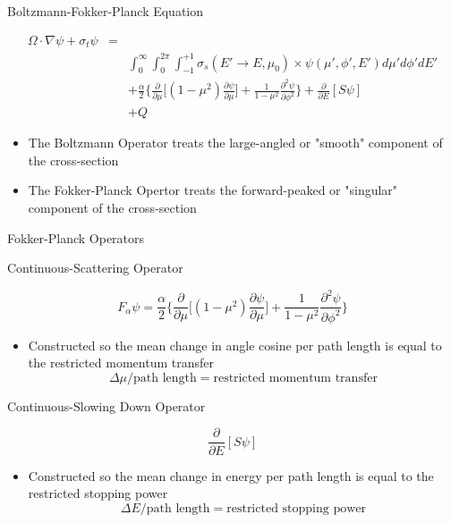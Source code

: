 \documentclass{beamer}
\begin{document}
\begin{frame}{Boltzmann-Fokker-Planck Equation}
 
    \begin{eqnarray*}
      \Omega \cdot \nabla \psi + \sigma_t\psi &= & \\
      & & \int_{0}^{\infty}\int_{0}^{2\pi}\int_{-1}^{+1} \sigma_s(E'\rightarrow E,\mu_0)
       \times\psi(\mu',\phi',E')d\mu'd\phi'dE' \\
       & &+ \frac{\alpha}{2}\Big\{ \frac{\partial}{\partial \mu} \Big[(1-\mu^2)\frac{\partial \psi}{\partial \mu}\Big]+ \frac{1}{1-\mu^2}\frac{\partial^2\psi}{\partial\phi^2}\Big\} + \frac{\partial}{\partial E} [S\psi] \\
       & &+ Q
    \end{eqnarray*}

     \begin{itemize}
       \item The Boltzmann Operator treats the large-angled or "smooth" component of the cross-section

      \item The Fokker-Planck Opertor treats the forward-peaked or "singular" component of the cross-section
       
     \end{itemize}

\end{frame}

\begin{frame}{Fokker-Planck Operators}
     
  \begin{block}{Continuous-Scattering Operator}

    $$F_{\alpha}\psi=\frac{\alpha}{2}\Big\{ \frac{\partial}{\partial \mu}\Big[(1-\mu^2)\frac{\partial \psi}{\partial \mu}\Big]+ \frac{1}{1-\mu^2}\frac{\partial^2\psi}{\partial\phi^2}\Big\}$$
      
    \begin{itemize}
      \item Constructed so the mean change in angle cosine per path length is equal to the restricted momentum transfer $$ \Delta\mu/\text{path length} = \text{restricted momentum transfer}$$
    \end{itemize}
  \end{block}

  \begin{block}{Continuous-Slowing Down Operator}

    $$\frac{\partial}{\partial E} [S\psi]$$
      
    \begin{itemize}
      \item Constructed so the mean change in energy per path length is equal to the restricted stopping power $$ \Delta E/\text{path length} = \text{restricted stopping power}$$
    \end{itemize}

  \end{block}

\end{frame}
\end{document}
